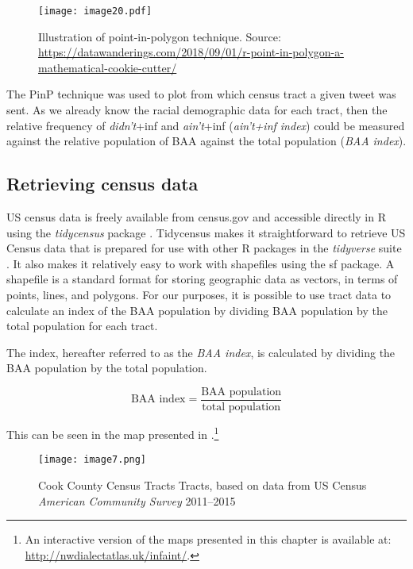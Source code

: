 \documentclass[output=paper,colorlinks,citecolor=brown,draftmode]{langscibook}
\begin{document}
\begin{figure}
    \texttt{[image: image20.pdf]}
    \caption{Illustration of point-in-polygon technique. Source: \url{https://datawanderings.com/2018/09/01/r-point-in-polygon-a-mathematical-cookie-cutter/}}
    \label{fig:pinp}
\end{figure}

The PinP technique was used to plot from which census tract a given tweet was sent. As we already know the racial demographic data for each tract, then the relative frequency of \textit{didn't}+inf and \textit{ain't}+inf  (\textit{ain't+inf index}) could be measured against the relative population of BAA against the total population (\textit{BAA index}).

\subsection{Retrieving census data}
US census data is freely available from census.gov and accessible directly in R using the \textit{tidycensus} package \citep{walker2023}. Tidycensus makes it straightforward to retrieve US Census data that is prepared for use with other R packages in the \textit{tidyverse} suite \citep{wickham2019}. It also makes it relatively easy to work with shapefiles using the sf package. A shapefile is a standard format for storing geographic data as vectors, in terms of points, lines, and polygons.  For our purposes, it is possible to use tract data to calculate an index of the BAA population by dividing BAA population by the total population for each tract. 

The index, hereafter referred to as the \textit{BAA index}, is calculated by dividing the BAA population by the total population. 

\[ \text{BAA index} = \frac{\text{BAA population}}{\text{total population}} \]

This can be seen in the map presented in .\footnote{An interactive version of the maps presented in this chapter is available at: \url{http://nwdialectatlas.uk/infaint/}.}


\begin{figure} 
    \texttt{[image: image7.png]}
    \caption{\label{fig:cook_county}Cook County Census Tracts Tracts, based on data from US Census \textit{American Community Survey} 2011--2015 \citep{bureau2015}}
   
\end{figure}
\end{document}
